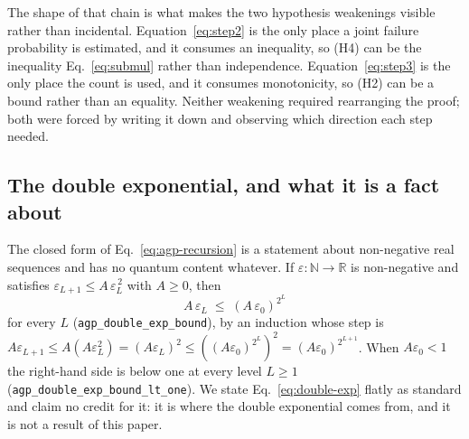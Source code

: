 \documentclass[aps,prx,reprint,nofootinbib,superscriptaddress]{revtex4-2}
\begin{document}
The shape of that chain is what makes the two hypothesis weakenings visible
rather than incidental. Equation~\eqref{eq:step2} is the only place a joint
failure probability is estimated, and it consumes an inequality, so (H4) can be
the inequality Eq.~\eqref{eq:submul} rather than independence.
Equation~\eqref{eq:step3} is the only place the count is used, and it consumes
monotonicity, so (H2) can be a bound rather than an equality. Neither weakening
required rearranging the proof; both were forced by writing it down and
observing which direction each step needed.

\subsection{The double exponential, and what it is a fact about}

The closed form of Eq.~\eqref{eq:agp-recursion} is a statement about
non-negative real sequences and has no quantum content whatever. If
$\varepsilon : \mathbb{N} \to \mathbb{R}$ is non-negative and satisfies
$\varepsilon_{L+1} \le A\,\varepsilon_L^{\,2}$ with $A \ge 0$, then
\begin{equation}
  A\,\varepsilon_L \;\le\; \left(A\,\varepsilon_0\right)^{2^L}
  \label{eq:double-exp}
\end{equation}
for every $L$ (\texttt{agp\_double\_exp\_bound}), by an induction whose step is
$A\varepsilon_{L+1} \le A(A\varepsilon_L^2) = (A\varepsilon_L)^2 \le
((A\varepsilon_0)^{2^L})^2 = (A\varepsilon_0)^{2^{L+1}}$. When
$A\varepsilon_0 < 1$ the right-hand side is below one at every level
$L \ge 1$ (\texttt{agp\_double\_exp\_bound\_lt\_one}). We state
Eq.~\eqref{eq:double-exp} flatly as standard and claim no credit for it: it is
where the double exponential comes from, and it is not a result of this paper.
\end{document}

